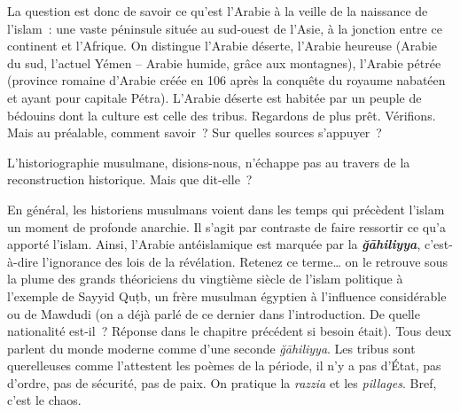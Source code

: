 La question est donc de savoir ce qu'est l'Arabie à la veille de la
naissance de l'islam~: une vaste péninsule située au sud-ouest de
l'Asie, à la jonction entre ce continent et l'Afrique. On distingue
l'Arabie déserte, l'Arabie heureuse (Arabie du sud, l'actuel Yémen --
Arabie humide, grâce aux montagnes), l'Arabie pétrée (province romaine
d'Arabie créée en 106 après la conquête du royaume nabatéen et ayant
pour capitale Pétra). L'Arabie déserte est habitée par un peuple de
bédouins dont la culture est celle des tribus. Regardons de plus prêt.
Vérifions. Mais au préalable, comment savoir~? Sur quelles sources
s'appuyer~?


L'historiographie musulmane, disions-nous, n'échappe pas au travers de
la reconstruction historique. Mais que dit-elle~?


En général, les historiens musulmans voient dans les temps qui précèdent
l'islam un moment de profonde anarchie. Il s'agit par contraste de faire
ressortir ce qu'a apporté l'islam. Ainsi, l'Arabie antéislamique est
marquée par la \emph{\textbf{ğāhiliyya}}, c'est-à-dire l'ignorance des
lois de la révélation. Retenez ce terme\ldots{} on le retrouve sous la
plume des grands théoriciens du vingtième siècle de l'islam politique à
l'exemple de Sayyid Quṭb, un frère musulman égyptien à l'influence
considérable ou de Mawdudi (on a déjà parlé de ce dernier dans
l'introduction. De quelle nationalité est-il~? Réponse dans le chapitre
précédent si besoin était). Tous deux parlent du monde moderne comme
d'une seconde \emph{ğāhiliyya}. Les tribus sont querelleuses comme
l'attestent les poèmes de la période, il n'y a pas d'État, pas d'ordre,
pas de sécurité, pas de paix. On pratique la \emph{razzia} et les
\emph{pillages}. Bref, c'est le chaos.

